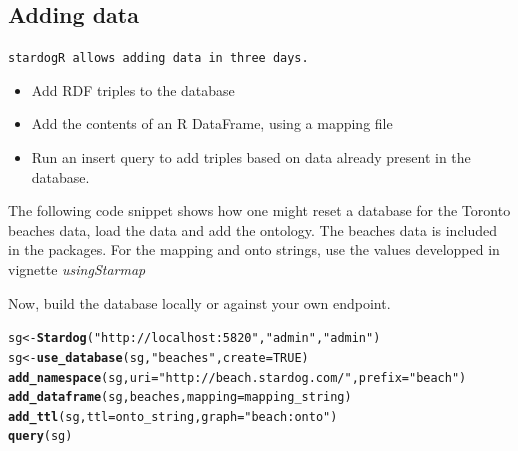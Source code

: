 \documentclass{article}\usepackage[]{graphicx}\usepackage[]{xcolor}
\makeatletter
\newcommand{\hlnum}[1]{\textcolor[rgb]{0.686,0.059,0.569}{#1}}%
\newcommand{\hlstr}[1]{\textcolor[rgb]{0.192,0.494,0.8}{#1}}%
\newcommand{\hlstd}[1]{\textcolor[rgb]{0.345,0.345,0.345}{#1}}%
\newcommand{\hlkwb}[1]{\textcolor[rgb]{0.69,0.353,0.396}{#1}}%
\newcommand{\hlkwc}[1]{\textcolor[rgb]{0.333,0.667,0.333}{#1}}%
\newcommand{\hlkwd}[1]{\textcolor[rgb]{0.737,0.353,0.396}{\textbf{#1}}}%
\newenvironment{kframe}{%
 \def\at@end@of@kframe{}%
 \ifinner\ifhmode%
  \def\at@end@of@kframe{\end{minipage}}%
  \begin{minipage}{\columnwidth}%
 \fi\fi%
 \def\FrameCommand##1{\hskip\@totalleftmargin \hskip-\fboxsep
 \colorbox{shadecolor}{##1}\hskip-\fboxsep
     \hskip-\linewidth \hskip-\@totalleftmargin \hskip\columnwidth}%
 \MakeFramed {\advance\hsize-\width
   \@totalleftmargin\z@ \linewidth\hsize
   \@setminipage}}%
 {\par\unskip\endMakeFramed%
 \at@end@of@kframe}
\newenvironment{knitrout}{}{} %
\makeatother
\begin{document}
\subsection{Adding data}

\tt{stardogR} allows adding data in three days.

\begin{itemize}
  \item Add RDF triples to the database
  \item Add the contents of an R DataFrame, using a mapping file
  \item Run an insert query to add triples based on data already present in the database.
\end{itemize}

The following code snippet shows how one might reset a database for the Toronto beaches data, load the data and add the ontology. The beaches data is included in the packages. For the mapping and onto strings, use the values developped in vignette \it{usingStarmap}


Now, build the database locally or against your own endpoint.

\begin{knitrout}
\color{fgcolor}\begin{kframe}
\begin{alltt}
\hlstd{sg} \hlkwb{<-} \hlkwd{Stardog}\hlstd{(}\hlstr{"http://localhost:5820"}\hlstd{,} \hlstr{"admin"}\hlstd{,} \hlstr{"admin"}\hlstd{)}
\hlstd{sg} \hlkwb{<-} \hlkwd{use_database}\hlstd{(sg,} \hlstr{"beaches"}\hlstd{,} \hlkwc{create} \hlstd{=} \hlnum{TRUE}\hlstd{)}
\hlkwd{add_namespace}\hlstd{(sg,} \hlkwc{uri} \hlstd{=} \hlstr{"http://beach.stardog.com/"}\hlstd{,} \hlkwc{prefix} \hlstd{=} \hlstr{"beach"}\hlstd{)}
\hlkwd{add_dataframe}\hlstd{(sg, beaches,} \hlkwc{mapping} \hlstd{= mapping_string)}
\hlkwd{add_ttl}\hlstd{(sg,} \hlkwc{ttl} \hlstd{= onto_string,} \hlkwc{graph} \hlstd{=} \hlstr{"beach:onto"}\hlstd{)}
\hlkwd{query}\hlstd{(sg)}
\end{alltt}
\end{kframe}
\end{knitrout}
\end{document}
